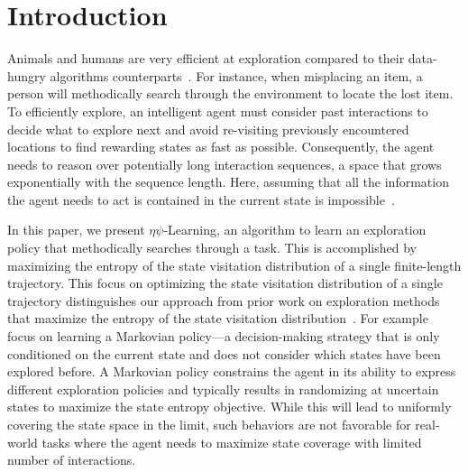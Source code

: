 \documentclass{article}
\theoremstyle{plain}
\theoremstyle{definition}
\theoremstyle{remark}
\newcommand{\alg}{$\eta$$\psi$-Learning}
\begin{document}
\section{Introduction}
Animals and humans are very efficient at exploration compared to their data-hungry algorithms counterparts~\citep{litman2005curiosity,kidd2015psychology, schmidhuber1991curiousmodel, schmidhuber2009simple, clark2018nice, ecoffet2019go,vinyals2017starcraft,schmidhuber2010formal}.
For instance, when misplacing an item, a person will methodically search through the environment to locate the lost item. 
To efficiently explore, an intelligent agent must consider past interactions to decide what to explore next and avoid re-visiting previously encountered locations to find rewarding states as fast as possible.
Consequently, the agent needs to reason over potentially long interaction sequences, a space that grows exponentially with the sequence length.
Here, assuming that all the information the agent needs to act is contained in the current state is impossible~\citep{mutti2022maximumentropyexploration}.

In this paper, we present \alg{}, an algorithm to learn an exploration policy that methodically searches through a task.
This is accomplished by maximizing the entropy of the state visitation distribution of a single finite-length trajectory.
This focus on optimizing the state visitation distribution of a single trajectory distinguishes our approach from prior work on exploration methods that maximize the entropy of the state visitation distribution~\cite{pmlr-v97-hazan19a, tarbouriech2019active,lee2019efficient,mutti2020intrinsically,guo2021geometric}.
For example~\citet{pmlr-v97-hazan19a} focus on learning a Markovian policy---a decision-making strategy that is only conditioned on the current state and does not consider which states have been explored before.
A Markovian policy constrains the agent in its ability to express different exploration policies and typically results in randomizing at uncertain states to maximize the state entropy objective.
While this will lead to uniformly covering the state space in the limit, such behaviors are not favorable for real-world tasks where the agent needs to maximize state coverage with limited number of interactions.  
\end{document}
